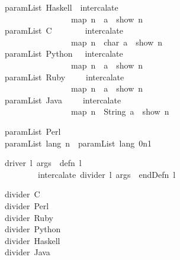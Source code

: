 \documentclass[12pt]{article}
\begin{document}
\begin{tabbing}\ttfamily
~~~paramList~Haskell~~intercalate~~~\\
\ttfamily ~~~~~~~~~~~~~~~~~~~map~n~~a~~show~n\\
\ttfamily ~~~paramList~C~~~~~~~~intercalate~~\\
\ttfamily ~~~~~~~~~~~~~~~~~~~map~n~~char~a~~show~n\\
\ttfamily ~~~paramList~Python~~~intercalate~~\\
\ttfamily ~~~~~~~~~~~~~~~~~~~map~n~~a~~show~n\\
\ttfamily ~~~paramList~Ruby~~~~~intercalate~~\\
\ttfamily ~~~~~~~~~~~~~~~~~~~map~n~~a~~show~n\\
\ttfamily ~~~paramList~Java~~~~~intercalate~~\\
\ttfamily ~~~~~~~~~~~~~~~~~~~map~n~~String~a~~show~n
\end{tabbing}
\begin{tabbing}\ttfamily
~~~paramList~Perl~~~~~~\\
\ttfamily ~~~paramList~lang~n~~paramList~lang~0n1
\end{tabbing}
\begin{tabbing}\ttfamily
~~~driver~l~args~~defn~l~\\
\ttfamily ~~~~~~~~~~~intercalate~divider~l~args~~endDefn~l
\end{tabbing}
\begin{tabbing}\ttfamily
~~~divider~C~~~~~~~~\\
\ttfamily ~~~divider~Perl~~~~~\\
\ttfamily ~~~divider~Ruby~~~~~\\
\ttfamily ~~~divider~Python~~~\\
\ttfamily ~~~divider~Haskell~~~\\
\ttfamily ~~~divider~Java~~~~~
\end{tabbing}
\end{document}
